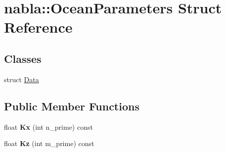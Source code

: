 \hypertarget{structnabla_1_1_ocean_parameters}{}\section{nabla\+::Ocean\+Parameters Struct Reference}
\label{structnabla_1_1_ocean_parameters}
\subsection*{Classes}
\begin{DoxyCompactItemize}
\item 
struct \mbox{\hyperlink{structnabla_1_1_ocean_parameters_1_1_data}{Data}}
\end{DoxyCompactItemize}
\subsection*{Public Member Functions}
\begin{DoxyCompactItemize}
\item 
\mbox{\label{structnabla_1_1_ocean_parameters_af42e29d38426948c5d46b3870f417fa6}} 
float {\bfseries Kx} (int n\+\_\+prime) const
\item 
\mbox{\label{structnabla_1_1_ocean_parameters_a066e6e10cb643b65cc73c18250f87c78}} 
float {\bfseries Kz} (int m\+\_\+prime) const
\end{DoxyCompactItemize}

